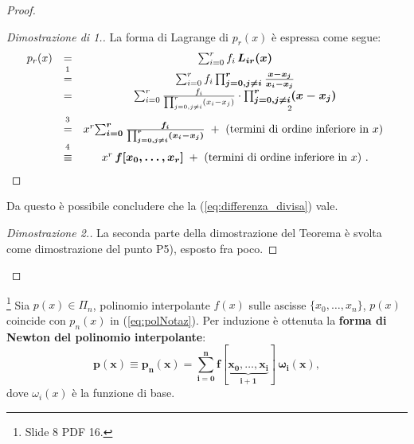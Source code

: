 \begin{proof}
\begin{proof}[Dimostrazione di 1.]
        La forma di Lagrange di $p_r(x)$ è espressa come segue:
        \begin{equation*}
            \begin{matrix}
                p_r(x) &=& \sum_{i=0}^r f_i\, \boldsymbol{L_{ir}(x)} \\
                &\overset{\footnotemark}{=}& \sum_{i=0}^r f_i\,\boldsymbol{\prod_{j=0, j\neq i}^r\frac{x-x_j}{x_i-x_j}} \\
                &=&\sum_{i=0}^r \frac{f_i}{\prod_{j=0, j\neq i}^r(x_i-x_j)}\cdot \underset{\footnotemark}{\boldsymbol{\prod_{j=0, j\neq i}^r(x-x_j)}} \\
                &\overset{\footnotemark}{=}& x^r\boldsymbol{\sum_{i=0}^r\frac{f_i}{\prod_{j=0, j\neq i}^r(x_i-x_j)}}\;+ \text{ (termini di ordine inferiore in $x$) }\\
                &\overset{\footnotemark}{\equiv}& x^r\, \boldsymbol{f[x_0,\hdots, x_r]}\; + \text{ (termini di ordine inferiore in $x$) }.
            \end{matrix}
        \end{equation*}
    \end{proof}
    \addtocounter{footnote}{-3}
    
    
    
    Da questo è possibile concludere che la (\ref{eq:differenza_divisa}) vale.

    \begin{proof}[Dimostrazione 2.]
        La seconda parte della dimostrazione del Teorema è svolta come dimostrazione del punto P5), esposto fra poco.
    \end{proof}
\end{proof}

\begin{remark}\label{rem:formaNewton}\footnote{Slide 8 PDF 16.}
    Sia $p(x)\in\Pi_n$, polinomio interpolante $f(x)$ sulle ascisse $\{x_0,\hdots, x_n\}$, $p(x)$ coincide con $p_n(x)$ in (\ref{eq:polNotaz}).
    Per induzione è ottenuta la \textbf{forma di Newton del polinomio interpolante}: 
    \begin{equation}\label{eq:polinomio_interpolante_newton}
        \boldsymbol{p(x)\equiv p_n(x) = \sum_{i=0}^{n} f[\underbrace{x_0,\hdots, x_i}_{i+1}]\,\omega_i(x)},
    \end{equation}
    dove $\omega_i(x)$ è la funzione di base.
\end{remark}


